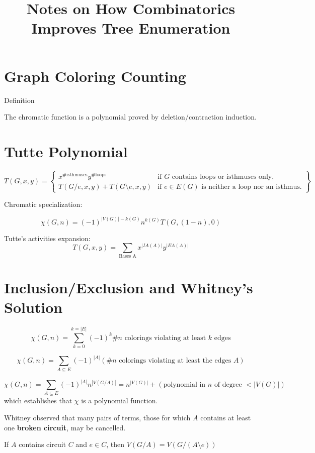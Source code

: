 \documentclass{article}
\title{Notes on How Combinatorics Improves Tree Enumeration}
\begin{document}
\maketitle

\section{Graph Coloring Counting}

Definition

The chromatic function is a polynomial proved by deletion/contraction
induction.

\section{Tutte Polynomial}

\[
T(G,x,y) = \left\{ \begin{array}{ll}
  x^{\text{\# isthmuses}}y^{\text{\# loops}} & \text{if }G\text{ contains loops or isthmuses only,}\\
  T(G/e,x,y)+T(G\setminus e,x,y) & \text{if }e\in E(G)
     \text{ is neither a loop nor an isthmus.}
  \end{array}
  \right\}
\]

Chromatic specialization:

\[
\chi(G,n) = (-1)^{|V(G)|-k(G)}n^{k(G)}T(G,(1-n),0)
\]

Tutte's activities expansion:
\[
T(G,x,y) = \sum_{\text{Bases A}}x^{|IA(A)|}y^{|EA(A)|}
\]


\section{Inclusion/Exclusion and Whitney's Solution}

\[
\chi(G,n) = \sum_{k=0}^{k=|E|}(-1)^k \text{\# }n\text{ colorings violating at least }
k\text{ edges}
\]

\[
\chi(G,n) = \sum_{A\subseteq E}(-1)^{|A|} 
(\text{\# }n\text{ colorings violating at least the edges }A)
\]

\[
\chi(G,n) = \sum_{A\subseteq E}(-1)^{|A|}
n^{|V(G/A)|} = n^{|V(G)|} + (\text{polynomial in } n \text{ of degree } < |V(G)|)
\]
which establishes that $\chi$ is a polynomial function.  

Whitney\cite{WhitLogExpMath} observed that 
many pairs of terms, those for which $A$ contains at least 
one \textbf{broken circuit}, may be cancelled.

If $A$ contains circuit $C$ and $e\in C$, then $V(G/A) = V(G/(A\setminus e))$
\end{document}
